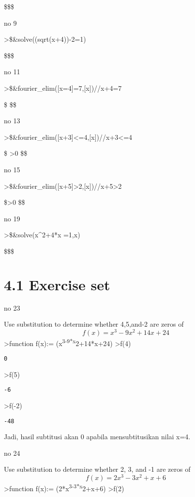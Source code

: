 \documentclass[
]{book}
\begin{document}
\$\left[ x=\frac{13}{6} , x=-1 \right] \$\$

no 9

\textgreater\$\&solve((sqrt(x+4))-2=1)

\$\left[ x=5 \right] \$\$

no 11

\textgreater\$\&fourier\_elim({[}x=4{]}=7,{[}x{]})//x+4=7

\$\left[ \left[ x-7=-3 \right] =0 \right{]} \$\$

no 13

\textgreater\$\&fourier\_elim({[}x+3{]}\textless=4,{[}x{]})//x+3\textless=4

\$\left[ \left[ x-1 \right] =0 \right{]} \lor \left[ \left[ 1-x   \right] \textgreater0 \right{]} \$\$

no 15

\textgreater\$\&fourier\_elim({[}x+5{]}\textgreater2,{[}x{]})//x+5\textgreater2

\$\left[ \left[ x+3 \right] \textgreater0 \right{]} \$\$

no 19

\textgreater\$\&solve(x\^{}2+4*x =1,x)

\$\left[ x=-\sqrt{5}-2 , x=\sqrt{5}-2 \right] \$\$

\section{4.1 Exercise set}\label{exercise-set-3}

no 23

Use substitution to determine whether 4,5,and-2 are zeros of\[f(x) = x^3-9x^2+14x+24\]\textgreater function f(x):= (x\textsuperscript{3-9*x}2+14*x+24) \textgreater f(4)

\begin{verbatim}
0
\end{verbatim}

\textgreater f(5)

\begin{verbatim}
-6
\end{verbatim}

\textgreater f(-2)

\begin{verbatim}
-48
\end{verbatim}

Jadi, hasil subtitusi akan 0 apabila mensubtitusikan nilai x=4.

no 24

Use substitution to determine whether 2, 3, and -1 are zeros of\[f(x)=2x^3-3x^2+x+6\]\textgreater function f(x):= (2*x\textsuperscript{3-3*x}2+x+6) \textgreater f(2)
\end{document}
